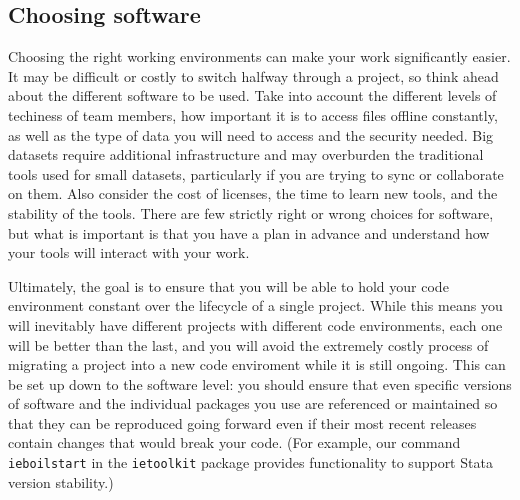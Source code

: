 \subsection{Choosing software}

Choosing the right working environments can make your work significantly easier.
It may be difficult or costly to switch halfway through a project, so
think ahead about the different software to be used.
Take into account the different levels of techiness of team members,
how important it is to access files offline constantly,
as well as the type of data you will need to access and the security needed.
Big datasets require additional infrastructure and may overburden
the traditional tools used for small datasets,
particularly if you are trying to sync or collaborate on them.
Also consider the cost of licenses, the time to learn new tools,
and the stability of the tools.
There are few strictly right or wrong choices for software,
but what is important is that you have a plan in advance
and understand how your tools will interact with your work.

Ultimately, the goal is to ensure that you will be able to hold
your code environment constant over the lifecycle of a single project.
While this means you will inevitably have different projects
with different code environments, each one will be better than the last,
and you will avoid the extremely costly process of migrating a project
into a new code enviroment while it is still ongoing.
This can be set up down to the software level:
you should ensure that even specific versions of software
and the individual packages you use
are referenced or maintained so that they can be reproduced going forward
even if their most recent releases contain changes that would break your code.
(For example, our command \texttt{ieboilstart} in the \texttt{ietoolkit} package
provides functionality to support Stata version stability.)

